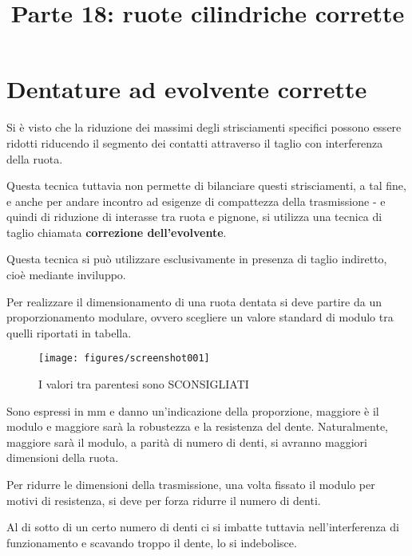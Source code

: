 \documentclass[a4paper, 15pt]{article}
\title{Parte 18: ruote cilindriche corrette}
\date{}
\begin{document}
			\maketitle
			\setcounter{tocdepth}{5}  %
			\tableofcontents 
			\newpage
			
			
			
			\section{Dentature ad evolvente corrette}
			\begin{adjustwidth}{2in}{}	
				Si è visto che la riduzione dei massimi degli strisciamenti specifici possono essere ridotti riducendo il segmento dei contatti attraverso il taglio con interferenza della ruota. 
				
				Questa tecnica tuttavia non permette di bilanciare questi strisciamenti, a tal fine, e anche per andare incontro ad esigenze di compattezza della trasmissione - e quindi di riduzione di interasse tra ruota e pignone,  si utilizza una tecnica di taglio chiamata \textbf{correzione dell'evolvente}. 
				
				Questa tecnica si può utilizzare esclusivamente in presenza di taglio indiretto, cioè mediante inviluppo. \newline 
				
				Per realizzare il dimensionamento di una ruota dentata si deve partire da un proporzionamento modulare, ovvero scegliere un valore standard di modulo tra quelli riportati in tabella.
				\begin{figure}[H]
					\centering
					\texttt{[image: figures/screenshot001]}
					\caption{I valori tra parentesi sono SCONSIGLIATI}
					\label{fig:screenshot001}
				\end{figure}
				Sono espressi in mm e danno un'indicazione della proporzione, maggiore è il modulo e maggiore sarà la robustezza e la resistenza del dente. Naturalmente, maggiore sarà il modulo, a parità di numero di denti, si avranno maggiori dimensioni della ruota. \newline
				
				Per ridurre le dimensioni della trasmissione, una volta fissato il modulo per motivi di resistenza, si deve per forza ridurre il numero di denti. 
				
				Al di sotto di un certo numero di denti ci si imbatte tuttavia nell'interferenza di funzionamento e scavando troppo il dente, lo si indebolisce.
				

\end{adjustwidth}
\end{document}
